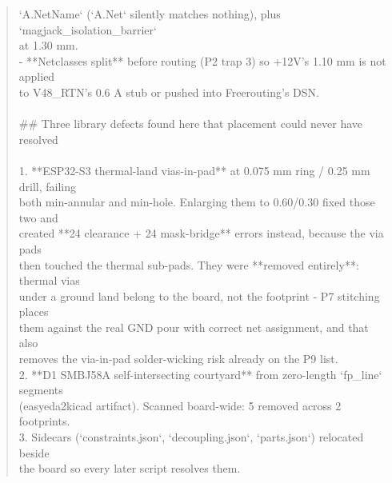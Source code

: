\documentclass[11pt,a4paper]{article}
\begin{document}
\begin{quote}
  `A.NetName` (`A.Net` silently matches nothing), plus `magjack\_isolation\_barrier`\\
  at 1.30 mm.\\
- {*}{*}Netclasses split{*}{*} before routing (P2 trap 3) so +12V's 1.10 mm is not applied\\
  to V48\_RTN's 0.6 A stub or pushed into Freerouting's DSN.\\
~\\
\#\# Three library defects found here that placement could never have resolved\\
~\\
1. {*}{*}ESP32-S3 thermal-land vias-in-pad{*}{*} at 0.075 mm ring / 0.25 mm drill, failing\\
   both min-annular and min-hole. Enlarging them to 0.60/0.30 fixed those two and\\
   created {*}{*}24 clearance + 24 mask-bridge{*}{*} errors instead, because the via pads\\
   then touched the thermal sub-pads. They were {*}{*}removed entirely{*}{*}: thermal vias\\
   under a ground land belong to the board, not the footprint - P7 stitching places\\
   them against the real GND pour with correct net assignment, and that also\\
   removes the via-in-pad solder-wicking risk already on the P9 list.\\
2. {*}{*}D1 SMBJ58A self-intersecting courtyard{*}{*} from zero-length `fp\_line` segments\\
   (easyeda2kicad artifact). Scanned board-wide: 5 removed across 2 footprints.\\
3. Sidecars (`constraints.json`, `decoupling.json`, `parts.json`) relocated beside\\
   the board so every later script resolves them.
\end{quote}
\end{document}
